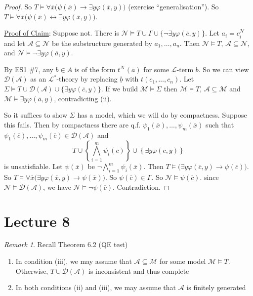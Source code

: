 \documentclass[]{article}
\theoremstyle{custhm}
\theoremstyle{cusdef}
\theoremstyle{custhm}
\theoremstyle{custhm}
\theoremstyle{custhm}
\theoremstyle{ex}
\theoremstyle{custhm}
\theoremstyle{cusdef}
\theoremstyle{remark}
\newtheorem*{remark*}{Remark}
\theoremstyle{remark}
\renewcommand{\L}{\mathcal{L}}
\newcommand{\M}{\mathcal{M}}
\renewcommand{\phi}{\varphi}
\renewcommand{\bar}{\overline}
\newcommand{\N}{\mathcal{N}}
\newcommand{\A}{\mathcal{A}}
\newcommand{\D}{\mathcal{D}}
\renewcommand{\subset}{\subseteq}
\begin{document}
\begin{proof}
So $T\models \forall \bar{x}\big(\psi(\bar{x}) \rightarrow \exists y \phi(\bar{x},y)\big)$ (exercise ``generalisation''). So $T\models \forall \bar{x}\big(\psi(\bar{x})\leftrightarrow \exists y\phi(\bar{x},y)\big)$.

\underline{Proof of Claim}: Suppose not. There is $\N\models T\cup\Gamma \cup \{\neg \exists y\phi(\bar{c},y)\}$. Let $a_i = c_i^\N$ and let $\A\subset\N$ be the substructure generated by $a_1,\dots,a_n$. Then $\N\models T$, $\A\subset\N$, and $\N\models \neg \exists y\phi(\bar{a},y)$.

By ES1 \#7, any $b \in A$ is of the form $t^\N(\bar{a})$ for some $\L$-term $b$. So we can view $\D(\A)$ as an $\L^\ast$-theory by replacing $\underline{b}$ with $t(c_1,\dots,c_n)$. Let $\Sigma\models T\cup\D(\A)\cup\{\exists y\phi(\bar{c},y)\}$. If we build $\M\models \Sigma$ then $\M\models T$, $\A\subset \M$ and $\M\models \exists y \phi(\bar{a},y)$, contradicting (ii).

So it suffices to show $\Sigma$ has a model, which we will do by compactness. Suppose this fails. Then by compactness there are q.f. $\psi_1(\bar{x}),\dots,\psi_m(\bar{x})$ such that $\psi_1(\bar{c}),\dots,\psi_m(\bar{c})\in\D(\A)$ and $$ T\cup \left\lbrace \bigwedge_{i=1}^{m}\psi_i(\bar{c})\right\rbrace \cup \left\lbrace \exists y \phi(\bar{c},y)\right\rbrace$$ is unsatisfiable. Let $\psi(\bar{x})$ be $\neg \bigwedge_{i=1}^{m}\psi_i(\bar{x})$. Then $T\models \big(\exists y\phi(\bar{c},y)\rightarrow \psi(\bar{c})\big)$. So $T\models \forall \bar{x} \big(\exists y \phi(\bar{x},y)\rightarrow\psi(\bar{x})\big)$. So $\psi(\bar{c})\in \Gamma$. So $\N\models \psi(\bar{c})$. since $\N\models \D(\A)$, we have $\N\models \neg \psi(\bar{c})$. Contradiction.
\end{proof}


\section{Lecture 8}

\begin{remark*}
Recall Theorem 6.2 (QE test)
\begin{enumerate}[label=\arabic*)]
	\item In condition (iii), we may assume that $\A\subset\M$ for some model $\M\models T$. Otherwise, $T\cup \D(\A)$ is inconsistent and thus complete
	\item In both conditions (ii) and (iii), we may assume that $\A$ is finitely generated
\end{enumerate}
\end{remark*}
\end{document}
